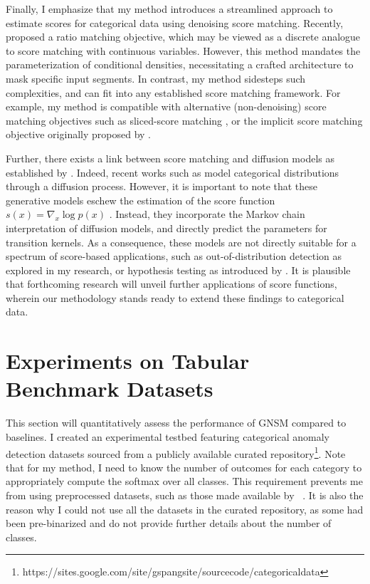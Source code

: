 Finally, I emphasize that my method introduces a streamlined approach to estimate scores for categorical data using denoising score matching. Recently, \cite{sun2023scorebased} proposed a ratio matching objective, which may be viewed as a discrete analogue to score matching with continuous variables. However, this method mandates the parameterization of conditional densities, necessitating a crafted architecture to mask specific input segments. In contrast, my method sidesteps such complexities, and can fit into any established score matching framework. For example, my method is compatible with alternative (non-denoising) score matching objectives such as sliced-score matching \cite{song2020sliced}, or the implicit score matching objective originally proposed by \cite{hyvarinen2005}.

Further, there exists a link between score matching and diffusion models as established by \cite{song2020score}. Indeed, recent works such as \cite{structured, argmax} model categorical distributions through a diffusion process. However, it is important to note that these generative models eschew the estimation of the score function $s(x) = \nabla_x \log p(x)$ . Instead, they incorporate the Markov chain interpretation of diffusion models, and directly predict the parameters for transition kernels. As a consequence, these models are not directly suitable for a spectrum of score-based applications, such as out-of-distribution detection as explored in my research, or hypothesis testing as introduced by \cite{hypothesis}. It is plausible that forthcoming research will unveil further applications of score functions, wherein our methodology stands ready to extend these findings to categorical data. 

\section{Experiments on Tabular Benchmark Datasets}\label{sec:gnsm_experiments}

This section will quantitatively assess the performance of GNSM compared to baselines. I created an experimental testbed featuring categorical anomaly detection datasets sourced from a publicly available curated repository\footnote{\scriptsize https://sites.google.com/site/gspangsite/sourcecode/categoricaldata}. Note that for my method, I need to know the number of outcomes for each category to appropriately compute the softmax over all classes. This requirement prevents me from using preprocessed datasets, such as those made available by ~\cite{han2022adbench}. It is also the reason why I could not use all the datasets in the curated repository, as some had been pre-binarized and do not provide further details about the number of classes.

